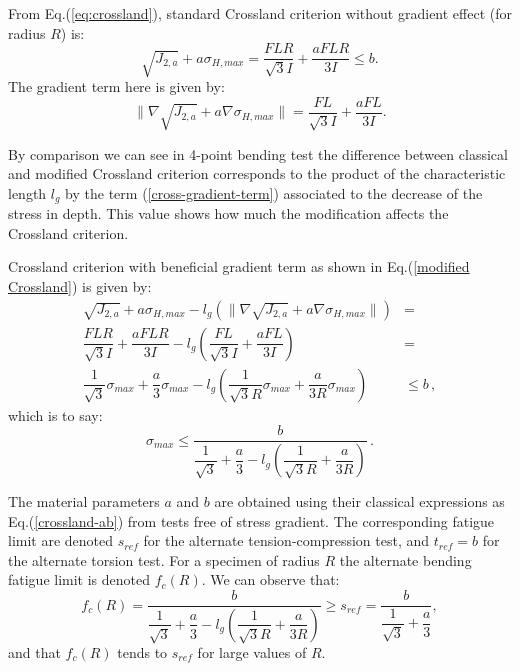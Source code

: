 \documentclass[3p,times,procedia,number]{elsarticle}
\begin{document}
From Eq.(\ref{eq:crossland}), standard Crossland criterion without gradient effect (for radius $R$) is:
\begin{equation}
\sqrt{J_{2,a}}+a\sigma_{H,max}=\dfrac{FLR}{\sqrt{3}I} +\dfrac{aFLR}{3I}\leqslant b.
\label{eq4pcross}
\end{equation}
The gradient term here is given by:
\begin{equation}
\parallel{\nabla\sqrt{J_{2,a}}}+a{\nabla \sigma_{H,max}}\parallel=\dfrac{FL}{\sqrt{3}I}+\dfrac{aFL}{3I}.
\label{cross-gradient-term}
\end{equation}

By comparison we can see in 4-point bending test the difference between classical and modified Crossland criterion corresponds to the product of the characteristic length $l_g$ by the term (\ref{cross-gradient-term}) associated to the decrease of the stress in depth. This value shows how much the modification affects the Crossland criterion. 

\noindent Crossland criterion with beneficial gradient term as shown in Eq.(\ref{modified Crossland}) is given by:
\begin{equation}
\begin{split}
\sqrt{J_{2,a}}+a\sigma_{H,max}-l_g(\parallel{\nabla\sqrt{J_{2,a}}}+a\nabla{\sigma_{H,max}}\parallel)&=\\ \dfrac{FLR}{\sqrt{3}I} +\dfrac{aFLR}{3I}-l_g\left( \dfrac{FL}{\sqrt{3}I}+\dfrac{aFL}{3I}\right) 
&=\\ \dfrac{1}{\sqrt{3}}\sigma_{max}+\dfrac{a}{3}\sigma_{max}-l_g\left( \dfrac{1}{\sqrt{3}R}\sigma_{max}+\dfrac{a}{3R}\sigma_{max}\right) &\leqslant b\, ,
\end{split}
\end{equation}
which is to say:
\begin{equation}
\sigma_{max}\leqslant\dfrac{b}{\dfrac{1}{\sqrt{3}}+\dfrac{a}{3}-l_g\left( \dfrac{1}{\sqrt{3}R}+\dfrac{a}{3R}\right) }\, .
\end{equation}

The material parameters $a$ and $b$ are obtained using their classical expressions as Eq.(\ref{crossland-ab}) from tests free of stress gradient. The corresponding fatigue limit are denoted $s_{ref}$ for the alternate tension-compression test, and $t_{ref}= b$ for the alternate torsion test. For a specimen of radius $R$
the alternate bending fatigue limit is denoted $f_c(R)$.
We can observe that:
\begin{equation}
f_c(R)=\dfrac{b}{\dfrac{1}{\sqrt{3}}+\dfrac{a}{3}-l_g\left( \dfrac{1}{\sqrt{3}R}+\dfrac{a}{3R}\right) }\geqslant s_{ref} = \dfrac{b}{\dfrac{1}{\sqrt{3}}+\dfrac{a}{3}},
\label{crossland-fr}
\end{equation}
and that $f_c(R)$ tends to $s_{ref}$ for large values of $R$.
\end{document}
